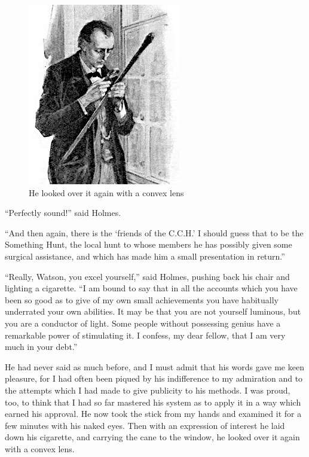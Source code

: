 \documentclass[paper=a5,BCOR=7mm,twoside,DIV=calc,12pt,usegeometry,openany,chapterprefix,endperiod,headings=big]{scrbook} %
\begin{document}
\begin{figure}[tbhp]
\centering
\includegraphics[width=0.6\linewidth]{01_convexlensdetail}
\caption{He looked over it again with a convex lens}
\end{figure}

\enquote{Perfectly sound!} said Holmes.

\enquote{And then again, there is the \enquote{friends of the C.C.H.} I should guess that to be the Something Hunt, the local hunt to whose members he has possibly given some surgical assistance, and which has made him a small presentation in return.}

\enquote{Really, Watson, you excel yourself,} said Holmes, pushing back his chair and lighting a cigarette. \enquote{I am bound to say that in all the accounts which you have been so good as to give of my own small achievements you have habitually underrated your own abilities. It may be that you are not yourself luminous, but you are a conductor of light. Some people without possessing genius have a remarkable power of stimulating it. I confess, my dear fellow, that I am very much in your debt.}

He had never said as much before, and I must admit that his words gave me keen pleasure, for I had often been piqued by his indifference to my admiration and to the attempts which I had made to give publicity to his methods. I was proud, too, to think that I had so far mastered his system as to apply it in a way which earned his approval. He now took the stick from my hands and examined it for a few minutes with his naked eyes. Then with an expression of interest he laid down his cigarette, and carrying the cane to the window, he looked over it again with a convex lens.
\end{document}
